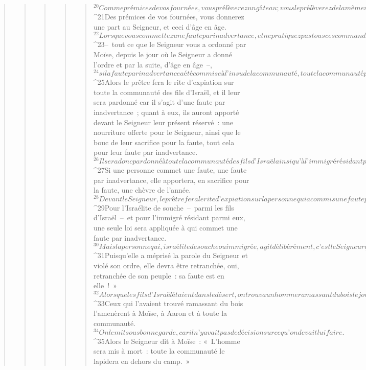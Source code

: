 \begin{verse}
\begin{verse}
\begin{verse}
\begin{verse}
\begin{verse}
${}^{20}Comme prémices de vos fournées, vous prélèverez un gâteau ; vous le prélèverez de la même manière que vous prélevez du grain sur l’aire à battre. 
${}^{21}Des prémices de vos fournées, vous donnerez une part au Seigneur, et ceci d’âge en âge.
${}^{22}Lorsque vous commettez une faute par inadvertance, et ne pratiquez pas tous ces commandements dont le Seigneur a parlé à Moïse, 
${}^{23}– tout ce que le Seigneur vous a ordonné par Moïse, depuis le jour où le Seigneur a donné l’ordre et par la suite, d’âge en âge –, 
${}^{24}si la faute par inadvertance a été commise à l’insu de la communauté, toute la communauté présentera un taureau en holocauste, en agréable odeur pour le Seigneur, avec son offrande de céréales et sa libation, suivant le rite, et elle présentera un bouc en sacrifice pour la faute. 
${}^{25}Alors le prêtre fera le rite d’expiation sur toute la communauté des fils d’Israël, et il leur sera pardonné car il s’agit d’une faute par inadvertance ; quant à eux, ils auront apporté devant le Seigneur leur présent réservé : une nourriture offerte pour le Seigneur, ainsi que le bouc de leur sacrifice pour la faute, tout cela pour leur faute par inadvertance. 
${}^{26}Il sera donc pardonné à toute la communauté des fils d’Israël ainsi qu’à l’immigré résidant parmi eux, car c’est tout le peuple qui a commis une faute par inadvertance.
${}^{27}Si une personne commet une faute, une faute par inadvertance, elle apportera, en sacrifice pour la faute, une chèvre de l’année. 
${}^{28}Devant le Seigneur, le prêtre fera le rite d’expiation sur la personne qui a commis une faute par inadvertance ; il fera donc le rite d’expiation sur elle, et elle sera pardonnée. 
${}^{29}Pour l’Israélite de souche – parmi les fils d’Israël – et pour l’immigré résidant parmi eux, une seule loi sera appliquée à qui commet une faute par inadvertance.
${}^{30}Mais la personne qui, israélite de souche ou immigrée, agit délibérément, c’est le Seigneur qu’elle outrage : cette personne sera retranchée du milieu de son peuple. 
${}^{31}Puisqu’elle a méprisé la parole du Seigneur et violé son ordre, elle devra être retranchée, oui, retranchée de son peuple : sa faute est en elle ! »
${}^{32}Alors que les fils d’Israël étaient dans le désert, on trouva un homme ramassant du bois le jour du sabbat. 
${}^{33}Ceux qui l’avaient trouvé ramassant du bois l’amenèrent à Moïse, à Aaron et à toute la communauté. 
${}^{34}On le mit sous bonne garde, car il n’y avait pas de décision sur ce qu’on devait lui faire.
${}^{35}Alors le Seigneur dit à Moïse : « L’homme sera mis à mort : toute la communauté le lapidera en dehors du camp. » 

\end{verse}
\end{verse}
\end{verse}
\end{verse}
\end{verse}

